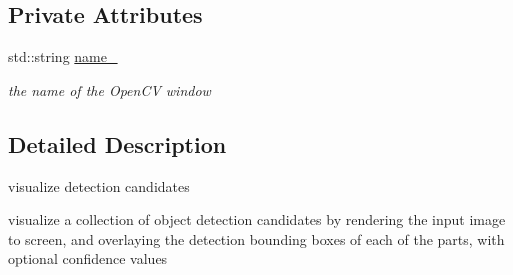 \subsection*{\-Private \-Attributes}
\begin{DoxyCompactItemize}
\item 
std\-::string \hyperlink{classVisualize_a1407427a175d3a6098df7c300c27bd0d}{name\-\_\-}
\begin{DoxyCompactList}\small\item\em the name of the \-Open\-C\-V window \end{DoxyCompactList}\end{DoxyCompactItemize}


\subsection{\-Detailed \-Description}
visualize detection candidates 

visualize a collection of object detection candidates by rendering the input image to screen, and overlaying the detection bounding boxes of each of the parts, with optional confidence values 

